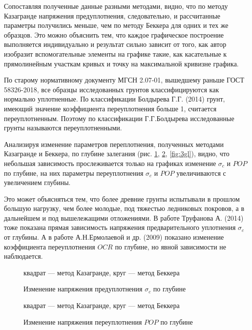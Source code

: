 Сопоставляя полученные данные разными методами, 
видно, что по методу Казагранде напряжения предуплотнения, 
следовательно, и рассчитанные параметры получились 
меньше, чем по методу Беккера для одних и тех же образцов.
Это можно объяснить тем, что каждое графическое построение 
выполняется индивидуально и результат сильно зависит от 
того, как автор изобразит вспомогательные элементы 
на графике такие, как касательные к прямолинейным участкам 
кривых и точку на максимальной кривизне графика.

По старому нормативному документу 
МГСН 2.07-01, вышедшему раньше ГОСТ 58326-2018, все образцы 
исследованных грунтов 
классифицируются как нормально 
уплотненные. По классификации Болдырева Г.Г. (2014) грунт, 
имеющий значение коэффициента переуплотнения 
больше 1, считается переуплотненным. Поэтому 
по классификации Г.Г.Болдырева 
исследованные грунты называются переуплотненными.

Анализируя изменение параметров переплотнения, 
полученных методами Казагранде и Беккера, по глубине залегания 
(рис. \ref{fig:1gl}, \ref{fig:2gl}, \ref{fig:3gl}), 
видно, что небольшая зависимость прослеживается только  
на графиках изменение $\sigma_c$ и $POP$ по глубине, на 
них параметры переуплотнения $\sigma_c$ и $POP$ увеличиваются 
с увеличением глубины.

Это может объясняться тем, что более древние 
грунты испытывали в прошлом большую нагрузку, 
чем более молодые, под тяжестью ледниковых покровов, 
а в дальнейшем и под вышележащими отложениями.
В работе Труфанова А. (2014) тоже 
показана прямая зависимость напряжения предварительного 
уплотнения $\sigma_c$ от глубины. А в работе А.Н.Ермолаевой и др. (2009)
показано изменение коэффициента переуплотнения $OCR$ по 
глубине, но явной зависимости не наблюдается.



\begin{figure}[ht]
  \caption{Изменение напряжения 
  предуплотнения $\sigma_c$ по глубине}\label{fig:1gl} 
  квадрат --- метод Казагранде, круг --- метод Беккера
\end{figure}

\begin{figure}[h!]
  \caption{Изменение напряжения 
  переуплотнения $POP$ по глубине}\label{fig:2gl}
  квадрат --- метод Казагранде, круг --- метод Беккера
\end{figure}

